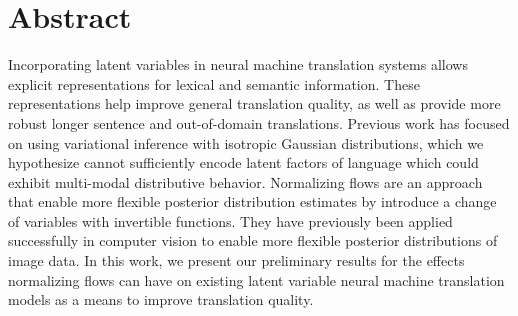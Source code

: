 
\chapter{Abstract}

Incorporating latent variables in neural machine translation systems allows explicit representations for lexical and semantic information. These representations help improve general translation quality, as well as provide more robust longer sentence and out-of-domain translations. Previous work has focused on using variational inference with isotropic Gaussian distributions, which we hypothesize cannot sufficiently encode latent factors of language which could exhibit multi-modal distributive behavior. Normalizing flows are an approach that enable more flexible posterior distribution estimates by introduce a change of variables with invertible functions. They have previously been applied successfully in computer vision to enable more flexible posterior distributions of image data. In this work, we present our preliminary results for the effects normalizing flows can have on existing latent variable neural machine translation models as a means to improve translation quality. 


